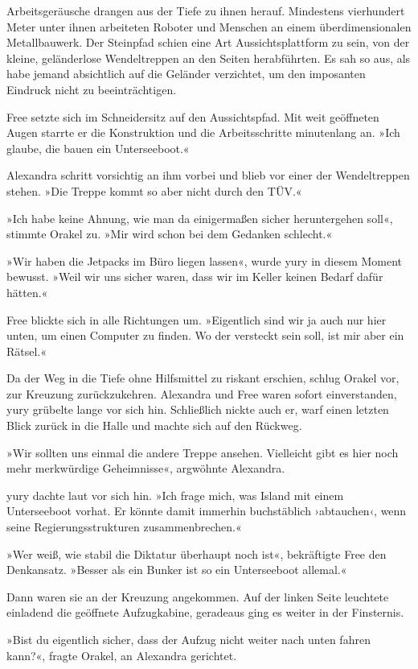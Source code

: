 Arbeitsgeräusche drangen aus der Tiefe zu ihnen herauf. Mindestens vierhundert Meter unter ihnen arbeiteten Roboter und Menschen an einem überdimensionalen Metallbauwerk. Der Steinpfad schien eine Art Aussichtsplattform zu sein, von der kleine, geländerlose Wendeltreppen an den Seiten herabführten. Es sah so aus, als habe jemand absichtlich auf die Geländer verzichtet, um den imposanten Eindruck nicht zu beeinträchtigen.

Free setzte sich im Schneidersitz auf den Aussichtspfad. Mit weit geöffneten Augen starrte er die Konstruktion und die Arbeitsschritte minutenlang an. »Ich glaube, die bauen ein Unterseeboot.«

Alexandra schritt vorsichtig an ihm vorbei und blieb vor einer der Wendeltreppen stehen. »Die Treppe kommt so aber nicht durch den TÜV.«

»Ich habe keine Ahnung, wie man da einigermaßen sicher heruntergehen soll«, stimmte Orakel zu. »Mir wird schon bei dem Gedanken schlecht.«

»Wir haben die Jetpacks im Büro liegen lassen«, wurde yury in diesem Moment bewusst. »Weil wir uns sicher waren, dass wir im Keller keinen Bedarf dafür hätten.«

Free blickte sich in alle Richtungen um. »Eigentlich sind wir ja auch nur hier unten, um einen Computer zu finden. Wo der versteckt sein soll, ist mir aber ein Rätsel.«

Da der Weg in die Tiefe ohne Hilfsmittel zu riskant erschien, schlug Orakel vor, zur Kreuzung zurückzukehren. Alexandra und Free waren sofort einverstanden, yury grübelte lange vor sich hin. Schließlich nickte auch er, warf einen letzten Blick zurück in die Halle und machte sich auf den Rückweg.

»Wir sollten uns einmal die andere Treppe ansehen. Vielleicht gibt es hier noch mehr merkwürdige Geheimnisse«, argwöhnte Alexandra.

yury dachte laut vor sich hin. »Ich frage mich, was Island mit einem Unterseeboot vorhat. Er könnte damit immerhin buchstäblich ›abtauchen‹, wenn seine Regierungsstrukturen zusammenbrechen.«

»Wer weiß, wie stabil die Diktatur überhaupt noch ist«, bekräftigte Free den Denkansatz. »Besser als ein Bunker ist so ein Unterseeboot allemal.«

Dann waren sie an der Kreuzung angekommen. Auf der linken Seite leuchtete einladend die geöffnete Aufzugkabine, geradeaus ging es weiter in der Finsternis.

»Bist du eigentlich sicher, dass der Aufzug nicht weiter nach unten fahren kann?«, fragte Orakel, an Alexandra gerichtet.

